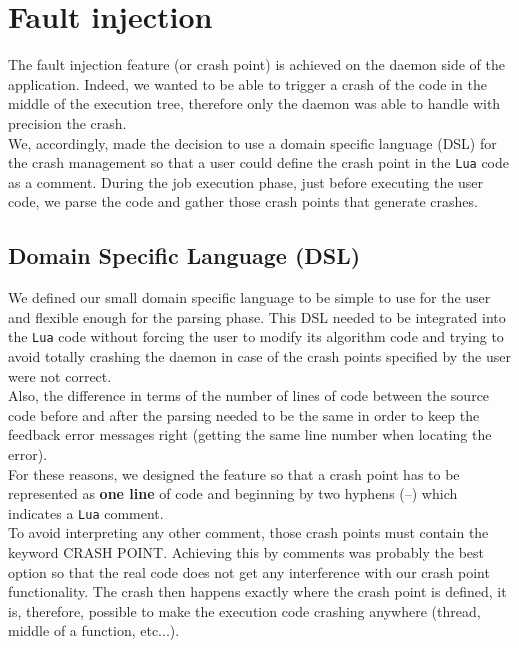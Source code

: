 \documentclass{eplmastersthesis}
\begin{document}
    \section{Fault injection}

      The fault injection feature (or crash point) is achieved on the daemon
      side of the application. Indeed, we wanted to be able to trigger a crash
      of the code in the middle of the execution tree, therefore only the
      daemon was able to handle with precision the crash.\\

      We, accordingly, made the decision to use a domain specific language (DSL)
      for the crash management so that a user could define the crash point
      in the \texttt{Lua} code as a comment. During the job execution phase, just before
      executing the user code, we parse the code and gather those crash
      points that generate crashes.

      \subsection{Domain Specific Language (DSL)}

        We defined our small domain specific language to be simple to use
        for the user and flexible enough for the parsing phase. This DSL
        needed to be integrated into the \texttt{Lua} code without forcing the user to
        modify its algorithm code and trying to avoid totally crashing
        the daemon in case of the crash points specified by the user were
        not correct.\\
        Also, the difference in terms of the number of lines of code between the
        source code before and after the parsing needed to be the same in
        order to keep the feedback error messages right (getting the same line
        number when locating the error).\\

        For these reasons, we designed the feature so that a crash point has
        to be represented as \textbf{one line} of code and beginning by
        two hyphens (--) which indicates a \texttt{Lua} comment.\\
        To avoid interpreting any other comment, those crash points must
        contain the keyword \textsc{CRASH POINT}. Achieving this by comments
        was probably the best option so that the real code does not get any
        interference with our crash point functionality. The crash then
        happens exactly where the crash point is defined, it is, therefore,
        possible to make the execution code crashing anywhere (thread, middle
        of a function, etc...).\\
\end{document}
